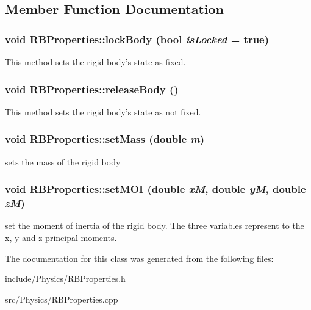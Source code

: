 \subsection{Member Function Documentation}
\hypertarget{classCartWheel_1_1Physics_1_1RBProperties_a1687b2917454eff9bc2e98221eafb6b6}{
\subsubsection[{lockBody}]{\setlength{\rightskip}{0pt plus 5cm}void RBProperties::lockBody (bool {\em isLocked} = {\ttfamily true})}}
\label{classCartWheel_1_1Physics_1_1RBProperties_a1687b2917454eff9bc2e98221eafb6b6}
This method sets the rigid body's state as fixed. \hypertarget{classCartWheel_1_1Physics_1_1RBProperties_a7c7c7d8946a396d35e02f4ceb2474ef2}{
\subsubsection[{releaseBody}]{\setlength{\rightskip}{0pt plus 5cm}void RBProperties::releaseBody ()}}
\label{classCartWheel_1_1Physics_1_1RBProperties_a7c7c7d8946a396d35e02f4ceb2474ef2}
This method sets the rigid body's state as not fixed. \hypertarget{classCartWheel_1_1Physics_1_1RBProperties_accb862bc36c91141bf5f61a48ce51474}{
\subsubsection[{setMass}]{\setlength{\rightskip}{0pt plus 5cm}void RBProperties::setMass (double {\em m})}}
\label{classCartWheel_1_1Physics_1_1RBProperties_accb862bc36c91141bf5f61a48ce51474}
sets the mass of the rigid body \hypertarget{classCartWheel_1_1Physics_1_1RBProperties_a81e85925571e28deb48e0339c0a98993}{
\subsubsection[{setMOI}]{\setlength{\rightskip}{0pt plus 5cm}void RBProperties::setMOI (double {\em xM}, \/  double {\em yM}, \/  double {\em zM})}}
\label{classCartWheel_1_1Physics_1_1RBProperties_a81e85925571e28deb48e0339c0a98993}
set the moment of inertia of the rigid body. The three variables represent to the x, y and z principal moments. 

The documentation for this class was generated from the following files:\begin{DoxyCompactItemize}
\item 
include/Physics/RBProperties.h\item 
src/Physics/RBProperties.cpp\end{DoxyCompactItemize}
